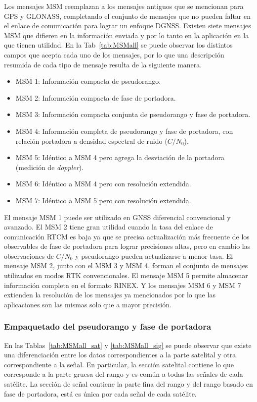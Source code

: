\documentclass[a4paper,12pt,oneside,onecolumn,final,openright]{book}%
\begin{document}
	Los mensajes MSM reemplazan a los mensajes antiguos que se mencionan para GPS y GLONASS, completando el conjunto de mensajes que no pueden faltar en el enlace de comunicación para lograr un enfoque DGNSS. Existen siete mensajes MSM que difieren en la información enviada y por lo tanto en la aplicación en la que tienen utilidad. En la Tab~\ref{tab:MSMall} se puede observar los distintos campos que acepta cada uno de los mensajes, por lo que una descripción resumida de cada tipo de mensaje resulta de la siguiente manera.
\begin{itemize}
	\item MSM 1: Información compacta de pseudorango.
	\item MSM 2: Información compacta de fase de portadora.
	\item MSM 3: Información compacta conjunta de pseudorango y fase de portadora.
	\item MSM 4: Información completa de pseudorango y fase de portadora, con relación portadora a densidad espectral de ruido ($C/N_0$).
	\item MSM 5: Idéntico a MSM 4 pero agrega la desviación de la portadora (medición de \textit{doppler}).
	\item MSM 6: Idéntico a MSM 4 pero con resolución extendida.
	\item MSM 7: Idéntico a MSM 5 pero con resolución extendida.
\end{itemize}

	El mensaje MSM 1 puede ser utilizado en GNSS diferencial convencional y avanzado. El MSM 2 tiene gran utilidad cuando la tasa del enlace de comunicación RTCM es baja ya que se precisa actualización más frecuente de los observables de fase de portadora para lograr precisiones altas, pero en cambio las observaciones de $C/N_0$ y pseudorango pueden actualizarse a menor tasa. El mensaje MSM 2, junto con el MSM 3 y MSM 4, forman el conjunto de mensajes utilizados en modos RTK convencionales. El mensaje MSM 5 permite almacenar información completa en el formato RINEX. Y los mensajes MSM 6 y MSM 7 extienden la resolución de los mensajes ya mencionados por lo que las aplicaciones son las mismas solo que a mayor precisión.

\subsubsection{Empaquetado del pseudorango y fase de portadora}\label{sec:rrng_frng}
	En las Tablas~\ref{tab:MSMall_sat} y \ref{tab:MSMall_sig} se puede observar que existe una diferenciación entre los datos correspondientes a la parte satelital y otra correspondiente a la señal. En particular, la sección satelital contiene lo que corresponde a la parte gruesa del rango y es común a todas las señales de cada satélite. La sección de señal contiene la parte fina del rango y del rango basado en fase de portadora, está es única por cada señal de cada satélite. 
	
\end{document}
